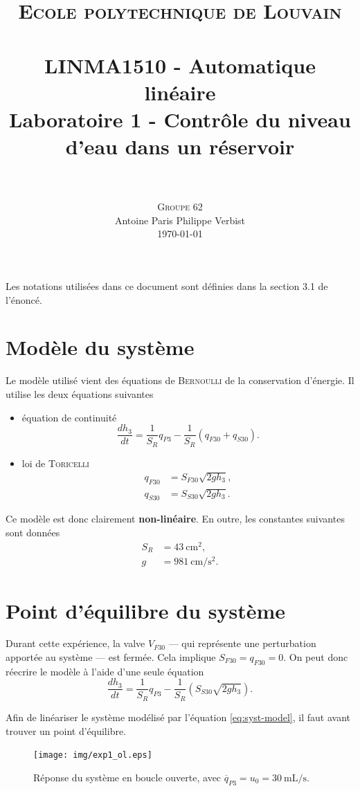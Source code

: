 \documentclass[frenchb, paper=a4, fontsize=11pt]{scrartcl}
\title{
		\usefont{OT1}{bch}{b}{n}
		\normalfont \normalsize \textsc{Ecole polytechnique de Louvain} \\ [25pt]
		\horrule{0.5pt} \\[0.4cm]
		\large LINMA1510 - Automatique linéaire\\
		\huge Laboratoire 1 - Contrôle du niveau d'eau dans un réservoir \\
		\horrule{1.5pt} \\[0.5cm]
}
\author{
		\normalfont
		\textsc{Groupe 62}\\
      	Antoine Paris\hspace{0.6cm} Philippe Verbist \\	
       	\normalsize
        \today
}
\date{}
\newcommand*\eq[1]{\overline{#1}} 				%
\numberwithin{equation}{section}					%
\numberwithin{figure}{section}					%
\numberwithin{table}{section}						%
\begin{document}
\maketitle

Les notations utilisées dans ce document sont définies dans la section 3.1
de l'énoncé.

\section{Modèle du système}
Le modèle utilisé vient des équations de \textsc{Bernoulli} de la
conservation d'énergie. Il utilise les deux équations suivantes
\begin{itemize}
	\item équation de continuité
	\begin{equation}
		\frac{dh_3}{dt} = \frac{1}{S_R}q_{P3} - \frac{1}{S_R}(q_{F30}+q_{S30}).
		\label{eq:contnuity}
	\end{equation}
	\item loi de \textsc{Toricelli}
	\begin{align}
		q_{F30} &= S_{F30} \sqrt{2gh_3} \label{eq:toricelliF}, \\
		q_{S30} &= S_{S30} \sqrt{2gh_3} \label{eq:toricelliS}.
	\end{align}
\end{itemize}
Ce modèle est donc clairement \textbf{non-linéaire}.
En outre, les constantes suivantes sont données
\begin{align}
	S_R	&= \SI{43}{\cm\squared}, \\
	g 	&= \SI{981}{\cm\per\second\squared}.
\end{align}

\section{Point d'équilibre du système}
Durant cette expérience, la valve $V_{F30}$ --- qui représente
une perturbation apportée au système --- est fermée. Cela
implique $S_{F30} = q_{F30} = 0$. On peut donc réecrire le modèle à l'aide
d'une seule équation
\begin{equation}
	\frac{dh_3}{dt} = \frac{1}{S_R}q_{P3} - \frac{1}{S_R}(S_{S30} \sqrt{2gh_3}).
	\label{eq:syst-model}
\end{equation}

Afin de linéariser le système modélisé par l'équation \ref{eq:syst-model},
il faut avant trouver un point d'équilibre.

\begin{figure}[!ht]
	\centering
	\texttt{[image: img/exp1\_ol.eps]}
	\caption{Réponse du système en boucle ouverte, avec $\eq{q}_{P3} = u_0 =
	\SI{30}{\milli\liter\per\second}$.}
	\label{fig:exp1_ol}
\end{figure}
\end{document}

